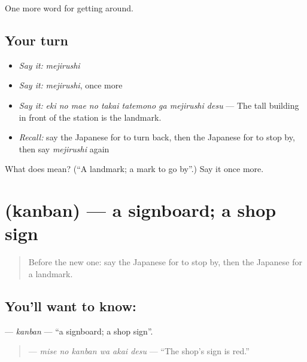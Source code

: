 \begin{grammarlens}[title={What you've built}]
One more word for getting around.
\end{grammarlens}

\subsection*{Your turn}
\begin{itemize}
\raggedright
  \item \emph{Say it:} \emph{mejirushi}
  \item \emph{Say it:} \emph{mejirushi}, once more
  \item \emph{Say it:} \emph{eki no mae no takai tatemono ga mejirushi desu} — The tall building in front of the station is the landmark.
  \item \emph{Recall:} say the Japanese for to turn back, then the Japanese for to stop by, then say \emph{mejirushi} again
\end{itemize}

\begin{tcolorbox}[breakable,colback=teal!4,colframe=teal!35!black,title={Before you move on}]
What does  mean? (\textquotedblleft{}A landmark; a mark to go by\textquotedblright{}.) Say it once more.
\end{tcolorbox}
\section[\texorpdfstring{\ja{かんばん} (kanban)}{かんばん (kanban)}]{ (kanban) — a signboard; a shop sign}

\label{lesson:JA-C393-kanban}



\begin{quote}
Before the new one: say the Japanese for to stop by, then the Japanese for a landmark.
\end{quote}

\subsection*{You'll want to know: }
\textbf{} — \emph{kanban} — \textquotedblleft{}a signboard; a shop sign\textquotedblright{}.

\begin{quote}
\textbf{  } — \emph{mise no kanban wa akai desu} — \textquotedblleft{}The shop's sign is red.\textquotedblright{}
\end{quote}

